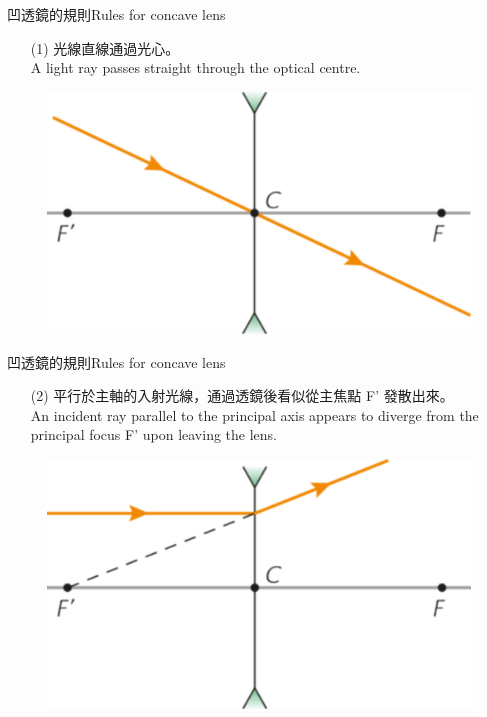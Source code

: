 \documentclass[beamer=true]{standalone}
\begin{document}
\begin{frame}{凹透鏡的規則Rules for concave lens}
    \begin{itemize}
        \item [(1)] 光線直線通過光心。\\A light ray passes straight through the optical centre.
    \end{itemize}\bigskip
    \begin{figure}
        \centering
        \includegraphics[width=0.5\linewidth]{assets/ima8e9nu1289e9nue9812ge.png}


    \end{figure}
\end{frame}


\begin{frame}{凹透鏡的規則Rules for concave lens}
    \begin{itemize}
        \item [(2)] 平行於主軸的入射光線，通過透鏡後看似從主焦點 F' 發散出來。\\An incident ray parallel to the principal axis appears to diverge from the principal focus F' upon leaving the lens.
    \end{itemize}\bigskip
    \begin{figure}
        \centering
        \includegraphics[width=0.5\linewidth]{assets/dun98dud98n98322d3.png}


    \end{figure}
\end{frame}
\end{document}
